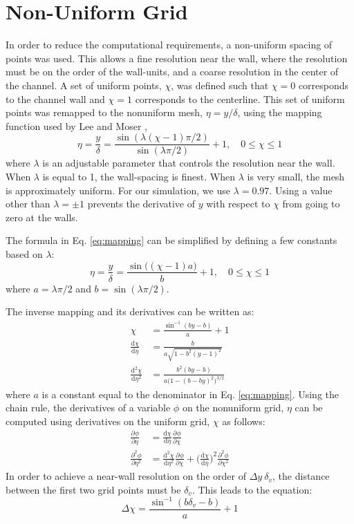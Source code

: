 \documentclass[a4paper,11pt]{article}
\newcommand{\pderiv}[3][]{%
  \ensuremath{\frac{\partial^{#1} {#2}}{\partial {#3}^{#1}}}}
\begin{document}
\section{Non-Uniform Grid}
In order to reduce the computational requirements, a non-uniform spacing of points was used.  This allows a fine resolution near the wall, where the resolution must be on the order of the wall-units, and a coarse resolution in the center of the channel.  A set of uniform points, $\chi$, was defined such that $\chi=0$ corresponds to the channel wall and $\chi=1$ corresponds to the centerline.  This set of uniform points was remapped to the nonuniform mesh, $\eta = y/\delta$, using the mapping function used by Lee and Moser \cite{Lee},
\begin{equation} \label{eq:mapping}
 \eta = \frac{y}{\delta} = \frac{\sin(\lambda (\chi-1) \pi/2)}{\sin(\lambda \pi/2)}+1, \quad 0 \le \chi \le 1
\end{equation}
where $\lambda$ is an adjustable parameter that controls the resolution near the
wall. When $\lambda$ is equal to 1, the wall-spacing is finest.  When $\lambda$
is very small, the mesh is approximately uniform.  For our simulation, we use
$\lambda = 0.97$.  Using a value other than $\lambda = \pm 1$ prevents the
derivative of $y$ with respect to $\chi$ from going to zero at the walls.

The formula in Eq. \ref{eq:mapping} can be simplified by defining a few
constants based on $\lambda$:
\begin{equation}
 \eta = \frac{y}{\delta} = \frac{\sin\big((\chi-1)a\big)}{b}+1, \quad 0 \le \chi \le 1
\end{equation}
where $a = \lambda \pi/2$ and $b = \sin (\lambda \pi/2)$.

The inverse mapping and its derivatives can be written as:
\begin{align}
  \chi &= \frac{\sin^{-1}(by-b)}{a} + 1 \\
  \frac{\mathrm{d}\chi}{\mathrm{d}\eta} &= \frac{b}{a \sqrt{1-b^2(y-1)^2}} \label{eq:chi-y-1} \\
  \frac{\mathrm{d}^2\chi}{\mathrm{d}\eta^2} &= \frac{b^2(by-b)}{a\big(1-(b-by)^2\big)^{3/2}} \label{eq:chi-y-2}
\end{align}
where $a$ is a constant equal to the denominator in Eq. \ref{eq:mapping}.  Using the chain rule, the derivatives of a variable $\phi$ on the nonuniform grid, $\eta$ can be computed using derivatives on the uniform grid, $\chi$ as follows:
\begin{align}
 \pderiv{\phi}{\eta} &= \frac{\mathrm{d}\chi}{\mathrm{d}\eta} \pderiv{\phi}{\chi} \label{eq:phi-y-1} \\
 \pderiv[2]{\phi}{\eta} &= \frac{\mathrm{d}^2\chi}{\mathrm{d}\eta^2} \pderiv{\phi}{\chi} + \Big(\frac{\mathrm{d}\chi}{\mathrm{d}\eta} \Big)^2 \pderiv[2]{\phi}{\chi}  \label{eq:phi-y-2} 
\end{align}
In order to achieve a near-wall resolution on the order of $\Delta y ~ \delta_v$, the distance between the first two grid points must be $\delta_v$.  This leads to the equation:
\begin{equation}
 \Delta \chi = \frac{\sin^{-1}(b\delta_v -b)}{a}+1
\end{equation}
\end{document}
